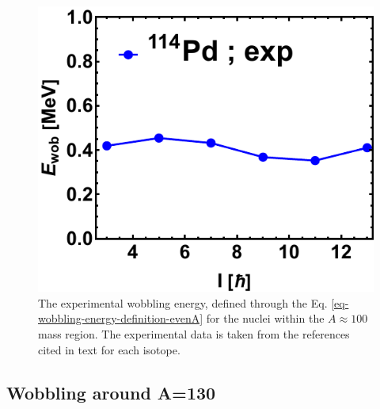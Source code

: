 \begin{figure}
    \includegraphics[scale=0.5]{Chapters/Figures/wobblers/114Pd.pdf}
    \caption{The experimental wobbling energy, defined through the Eq. \ref{eq-wobbling-energy-definition-evenA} for the nuclei within the $A\approx 100$ mass region. The experimental data is taken from the references cited in text for each isotope.}
    \label{wobblers-exp-set1}
\end{figure}

\subsection{Wobbling around A=130}

